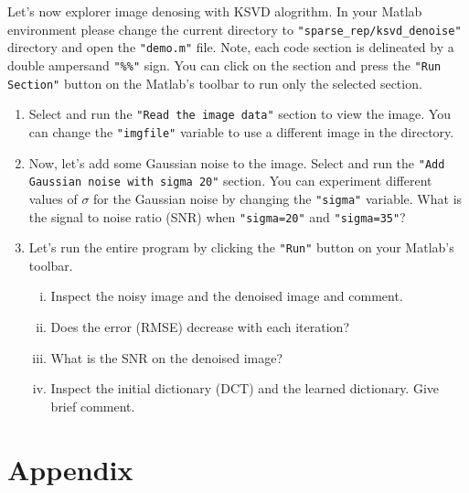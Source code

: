 \documentclass[12pt,letterpaper]{article}
\begin{document}
Let's now explorer image denosing with KSVD alogrithm. In your Matlab environment please change the current directory to \texttt{"sparse\_rep/ksvd\_denoise"} directory and open the \texttt{"demo.m"} file. Note, each code section is delineated by a double ampersand  \texttt{"\%\%"} sign. You can click on the section and press the \texttt{"Run Section"} button on the Matlab's toolbar to run only the selected section. 
\begin{enumerate}[1.]
    \item Select and run the \texttt{"Read the image data"} section to view the image. You can change the \texttt{"imgfile"} variable to use a different image in the directory. 
    
    \item Now, let's add some Gaussian noise to the image. Select  and run the \texttt{"Add Gaussian noise with sigma 20"} section. You can experiment different values of $\sigma$ for the Gaussian noise by changing the \texttt{"sigma"} variable. What is the signal to noise ratio (SNR) when \texttt{"sigma=20"} and \texttt{"sigma=35"}?
    
    
    \item Let's run the entire program by clicking the \texttt{"Run"} button on your Matlab's toolbar. 
    \begin{enumerate} [i.]
        \item Inspect the noisy image and the denoised image and comment.
        \item Does the error (RMSE) decrease with each iteration? 
        \item What is the SNR on the denoised image? 
        \item Inspect the initial dictionary (DCT) and the learned dictionary. Give brief comment.
    \end{enumerate}
\end{enumerate}
\pagebreak 

\section*{Appendix}
\end{document}
